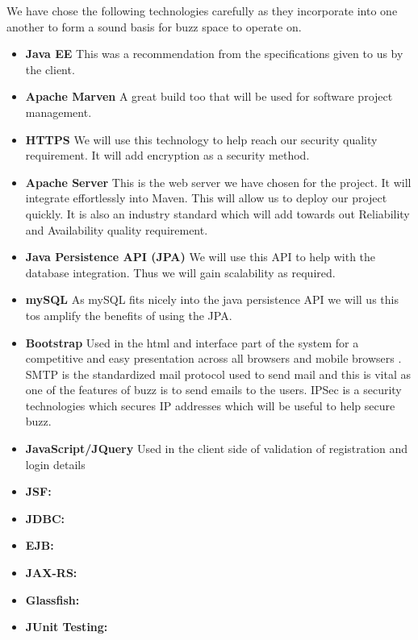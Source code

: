 We have chose the following technologies carefully as they incorporate into one another to form a sound basis for buzz space to operate on.

\begin{itemize}
	\item \textbf{Java EE}
		This was a recommendation from the specifications given to us by the client.
	\item \textbf{Apache Marven}
		A great build too that will be used for software project management.
	\item \textbf{HTTPS}
		We will use this technology to help reach our security quality requirement. It will add encryption as a security method.
	\item \textbf{Apache Server}
		This is the web server we have chosen for the project. It will integrate effortlessly into Maven. This will allow us to deploy our project quickly. It is also an industry standard which will add towards out Reliability and Availability quality requirement. 
	\item \textbf{Java Persistence API (JPA) }
		We will use this API to help with the database integration. Thus we will gain scalability as required.
	\item \textbf{mySQL}
		As mySQL fits nicely into the java persistence API we will us this tos amplify the benefits of using the JPA.
		
		\item \textbf{Bootstrap}
		Used in the html and interface part of the system for a competitive and easy presentation across all browsers 	and mobile browsers .
		\items SMTP is the standardized mail protocol used to send mail and this is vital as one of the features of buzz is to send emails to the users.
		\items IPSec is a security technologies which secures IP addresses which will be useful to help secure buzz.
	\item \textbf{JavaScript/JQuery}
		Used in the client side of validation of registration and login details
		
			\item \textbf{JSF:}
			\item \textbf{JDBC:}
			\item \textbf{EJB:}
			\item \textbf{JAX-RS:}
			\item \textbf{Glassfish:}
			\item \textbf{JUnit Testing:}
		
\end{itemize}